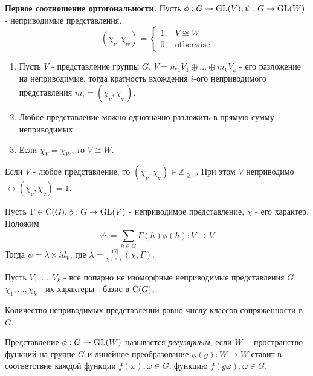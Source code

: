 \begin{thm}
\textbf{Первое соотношение ортогональности.} Пусть $\phi:G\to\operatorname{GL}(V),\psi:G\to\operatorname{GL}(W)$ - неприводимые представления.
\begin{equation*}
(\chi_{_V},\chi_{_W}) =
 \begin{cases}
   1, & V\cong W\\
   0, &\text{otherwise}
 \end{cases}
\end{equation*}
\end{thm}

\begin{ass}
\begin{enumerate}
  \item Пусть $V$ - представление группы $G$, $V = m_1V_1\oplus\ldots\oplus m_kV_k$ - его разложение на неприводимые, тогда кратность вхождения $i$-ого неприводимого представления $m_i=(\chi_{_V},\chi_{_{V_i}})$.
  \item Любое представление можно однозначно разложить в прямую сумму неприводимых.
  \item Если $\chi_V = \chi_W$, то $V\cong W$.
\end{enumerate}
\end{ass}

\begin{ass}
Если $V$ - любое представление, то $(\chi_{_V},\chi_{_V})\in\mathbb{Z}_{\geq 0}$. При этом $V$ неприводимо $\leftrightarrow (\chi_{_V},\chi_{_V}) = 1$.
\end{ass}

\begin{lemma}
Пусть $\Gamma\in\operatorname{C}(G),\phi:G\to\operatorname{GL}(V)$ - неприводимое представление, $\chi$ - его характер. Положим $$\psi:=\sum_{h\in G}\overline{\Gamma(h)}\phi(h):V\to V$$
Тогда $\psi = \lambda\times id_V$, где $\lambda = \frac{|G|}{\chi(e)}(\chi,\Gamma)$.
\end{lemma}

\begin{thm}
Пусть $V_1,\ldots,V_k$ - все попарно не изоморфные неприводимые представления $G$. $\chi_1,\ldots,\chi_k$ - их характеры - базис в $\operatorname{C}(G)$.
\end{thm}

\begin{ass}
Количество неприводимых представлений равно числу классов сопряженности в $G$.
\end{ass}

\begin{defi}
Представление $\phi:G\to \operatorname{GL}(W)$ называется \textit{регулярным}, если $W$— пространство функций на группе $G$ и линейное преобразование $\phi(g):W\to W$ ставит в соответствие каждой функции $f(\omega), \omega\in G$, функцию $f(g\omega), \omega\in G$.
\end{defi}

